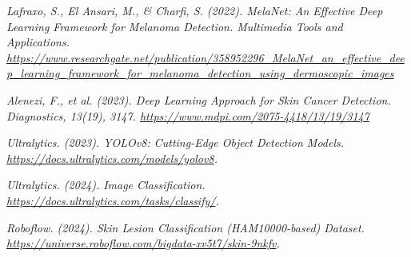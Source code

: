\documentclass[a4paper,12pt]{report}
\begin{document}
\begin{spacing}{1.5}
\begin{thebibliography}{99}
 \emph{Lafraxo, S., El Ansari, M., \& Charfi, S. (2022). MelaNet: An Effective Deep Learning Framework for Melanoma Detection. Multimedia Tools and Applications. \url{https://www.researchgate.net/publication/358952296_MelaNet_an_effective_deep_learning_framework_for_melanoma_detection_using_dermoscopic_images}}

 \emph{Alenezi, F., et al. (2023). Deep Learning Approach for Skin Cancer Detection. Diagnostics, 13(19), 3147. \url{https://www.mdpi.com/2075-4418/13/19/3147}}



 \emph{Ultralytics. (2023). YOLOv8: Cutting-Edge Object Detection Models. \url{https://docs.ultralytics.com/models/yolov8}.}


 \emph{Ultralytics. (2024). Image Classification. \url{https://docs.ultralytics.com/tasks/classify/}.} 



 \emph{Roboflow. (2024). Skin Lesion Classification (HAM10000-based) Dataset. \url{https://universe.roboflow.com/bigdata-xv5t7/skin-9nkfv}.}

\end{thebibliography}

\end{spacing}
\end{document}
